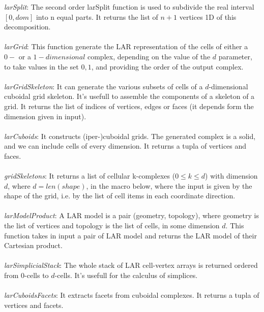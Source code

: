 \documentclass{article}
\begin{document}
\emph{larSplit}: The second order larSplit function is used to subdivide the real interval $[0, dom]$ into n equal parts. It returns the list of $n + 1$ vertices 1D of this decomposition.
\\ \\
\emph{larGrid}:  This function generate the LAR representation of the cells of either a $0-$ or a $1-dimensional$ complex, depending on the value of the $d$ parameter, to take values in the set ${0, 1}$, and providing the order of the output complex.
\\ \\
\emph{larGridSkeleton}: It can generate the various subsets of cells of a $d$-dimensional cuboidal grid skeleton.
It’s usefull to assemble the components of a skeleton of a grid. It returns the list of indices of vertices, edges or faces (it depends form the dimension given in input).
\\ \\
\emph{larCuboids}: It constructs (iper-)cuboidal grids. The generated complex is a solid, and we can include cells of every dimension. It returns a tupla of vertices and faces. 
\\ \\
\emph{gridSkeletons}: It returns a list of cellular k-complexes ($0 \leq k \leq d$) with dimension $d$, where $d = len(shape)$, in the macro below, where the input is given by the shape of the grid, i.e. by the list of cell items in each coordinate direction.
\\ \\
\emph{larModelProduct}: A LAR model is a pair (geometry, topology), where geometry is the list of vertices and topology is the list of cells, in some dimension $d$. This function takes in input a pair of LAR model and returns the LAR model of their Cartesian product.
\\ \\
\emph{larSimplicialStack}: The whole stack of LAR cell-vertex arrays is returned ordered from $0$-cells to $d$-cells.
It’s usefull for the calculus of simplices. 
\\ \\
\emph{larCuboidsFacets}: It extracts facets from cuboidal complexes. It returns a tupla of vertices and facets.

\newpage
\end{document}
